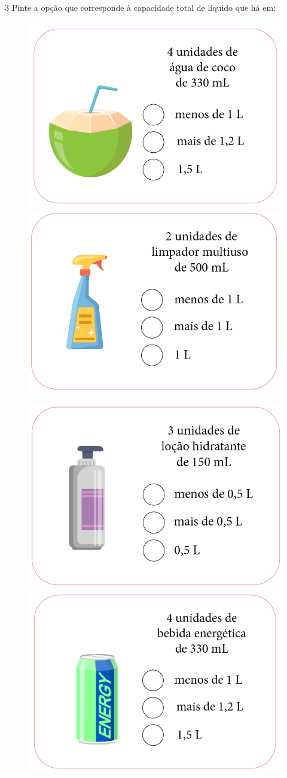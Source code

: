 
\pagebreak

\num{3} Pinte a opção que corresponde à capacidade total de líquido que
há em:

\begin{figure}[htpb!]
\includegraphics[width=.5\textwidth]{../ilustracoes/MAT5/SAEB_5ANO_MAT_figura31.png}
\includegraphics[width=.5\textwidth]{../ilustracoes/MAT5/SAEB_5ANO_MAT_figura31a.png}
\end{figure}

\begin{figure}[htpb!]
\includegraphics[width=.5\textwidth]{../ilustracoes/MAT5/SAEB_5ANO_MAT_figura31b.png}
\includegraphics[width=.5\textwidth]{../ilustracoes/MAT5/SAEB_5ANO_MAT_figura31c.png}
\end{figure}

